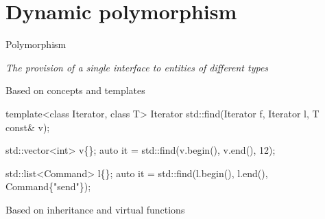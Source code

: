 

\section{Dynamic polymorphism}

\begin{frame}[fragile]{Polymorphism}

  \textit{The provision of a single interface to entities of different types}

  \begin{description}
  \item<2-> [static] Based on concepts and templates
    \begin{codeblock}
template<class Iterator, class T>
Iterator std::find(Iterator f, Iterator l, T const& v);

std::vector<int> v\{\ddd\};
auto it = std::find(v.begin(), v.end(), 12);

std::list<Command> l\{\ddd\};
auto it = std::find(l.begin(), l.end(), Command\{"send"\});\end{codeblock}
  \item<3-> [dynamic] Based on inheritance and virtual functions
  \end{description}
\end{frame}

